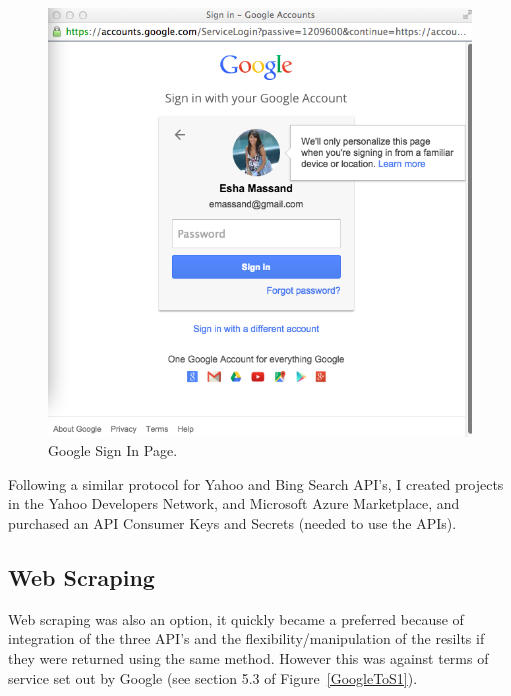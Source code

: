 \documentclass[a4paper, 11pt]{article}
\begin{document}
\begin{figure}[H]
\begin{center}
\includegraphics[scale=0.3]{GoogleSignIn}
\end{center}
\caption{Google Sign In Page.}
\label{GoogleSignInPage}

\end{figure}

Following a similar protocol for Yahoo and Bing Search API’s, I created projects in the Yahoo Developers Network, and Microsoft Azure Marketplace, and purchased an API Consumer Keys and Secrets (needed to use the APIs). 

\subsection{Web Scraping}
Web scraping was also an option, it quickly became a preferred because of integration of the three API’s and the flexibility/manipulation of  the resilts if they were returned using the same method. However this was against terms of service set out by Google (see section 5.3 of Figure~\ref{GoogleToS1}).
\end{document}
